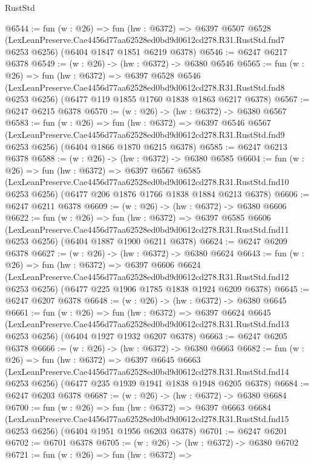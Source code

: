 \begin{lexlean}{RustStd}
\begin{coremodule}
@6544 := fun (w : @26) =>
  fun (hw : @6372) =>
  @6397
    @6507
    @6528
    (LexLeanPreserve.Cae4456d77aa62528ed0bd9d0612cd278.R31.RustStd.fnd7 @6253 @6256)
    (@6404 @1847 @1851 @6219 @6378)
@6546 := @6247 @6217 @6378
@6549 := (w : @26) -> (hw : @6372) -> @6380 @6546
@6565 := fun (w : @26) =>
  fun (hw : @6372) =>
  @6397
    @6528
    @6546
    (LexLeanPreserve.Cae4456d77aa62528ed0bd9d0612cd278.R31.RustStd.fnd8 @6253 @6256)
    (@6477 @119 @1855 @1760 @1838 @1863 @6217 @6378)
@6567 := @6247 @6215 @6378
@6570 := (w : @26) -> (hw : @6372) -> @6380 @6567
@6583 := fun (w : @26) =>
  fun (hw : @6372) =>
  @6397
    @6546
    @6567
    (LexLeanPreserve.Cae4456d77aa62528ed0bd9d0612cd278.R31.RustStd.fnd9 @6253 @6256)
    (@6404 @1866 @1870 @6215 @6378)
@6585 := @6247 @6213 @6378
@6588 := (w : @26) -> (hw : @6372) -> @6380 @6585
@6604 := fun (w : @26) =>
  fun (hw : @6372) =>
  @6397
    @6567
    @6585
    (LexLeanPreserve.Cae4456d77aa62528ed0bd9d0612cd278.R31.RustStd.fnd10 @6253 @6256)
    (@6477 @206 @1876 @1766 @1838 @1884 @6213 @6378)
@6606 := @6247 @6211 @6378
@6609 := (w : @26) -> (hw : @6372) -> @6380 @6606
@6622 := fun (w : @26) =>
  fun (hw : @6372) =>
  @6397
    @6585
    @6606
    (LexLeanPreserve.Cae4456d77aa62528ed0bd9d0612cd278.R31.RustStd.fnd11 @6253 @6256)
    (@6404 @1887 @1900 @6211 @6378)
@6624 := @6247 @6209 @6378
@6627 := (w : @26) -> (hw : @6372) -> @6380 @6624
@6643 := fun (w : @26) =>
  fun (hw : @6372) =>
  @6397
    @6606
    @6624
    (LexLeanPreserve.Cae4456d77aa62528ed0bd9d0612cd278.R31.RustStd.fnd12 @6253 @6256)
    (@6477 @225 @1906 @1785 @1838 @1924 @6209 @6378)
@6645 := @6247 @6207 @6378
@6648 := (w : @26) -> (hw : @6372) -> @6380 @6645
@6661 := fun (w : @26) =>
  fun (hw : @6372) =>
  @6397
    @6624
    @6645
    (LexLeanPreserve.Cae4456d77aa62528ed0bd9d0612cd278.R31.RustStd.fnd13 @6253 @6256)
    (@6404 @1927 @1932 @6207 @6378)
@6663 := @6247 @6205 @6378
@6666 := (w : @26) -> (hw : @6372) -> @6380 @6663
@6682 := fun (w : @26) =>
  fun (hw : @6372) =>
  @6397
    @6645
    @6663
    (LexLeanPreserve.Cae4456d77aa62528ed0bd9d0612cd278.R31.RustStd.fnd14 @6253 @6256)
    (@6477 @235 @1939 @1941 @1838 @1948 @6205 @6378)
@6684 := @6247 @6203 @6378
@6687 := (w : @26) -> (hw : @6372) -> @6380 @6684
@6700 := fun (w : @26) =>
  fun (hw : @6372) =>
  @6397
    @6663
    @6684
    (LexLeanPreserve.Cae4456d77aa62528ed0bd9d0612cd278.R31.RustStd.fnd15 @6253 @6256)
    (@6404 @1951 @1956 @6203 @6378)
@6701 := @6247 @6201
@6702 := @6701 @6378
@6705 := (w : @26) -> (hw : @6372) -> @6380 @6702
@6721 := fun (w : @26) =>
  fun (hw : @6372) =>

\end{coremodule}
\end{lexlean}
